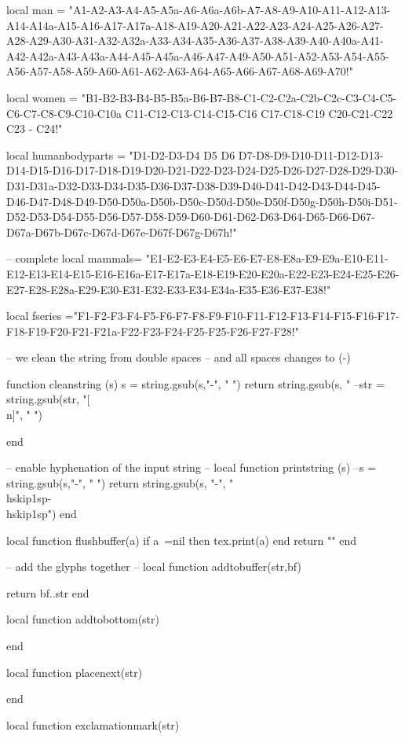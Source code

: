 \documentclass{article}
\begin{document}
\begin{luacode*}
local man = "A1-A2-A3-A4-A5-A5a-A6-A6a-A6b-A7-A8-A9-A10-A11-A12-A13-A14-A14a-A15-A16-A17-A17a-A18-A19-A20-A21-A22-A23-A24-A25-A26-A27-A28-A29-A30-A31-A32-A32a-A33-A34-A35-A36-A37-A38-A39-A40-A40a-A41-A42-A42a-A43-A43a-A44-A45-A45a-A46-A47-A49-A50-A51-A52-A53-A54-A55-A56-A57-A58-A59-A60-A61-A62-A63-A64-A65-A66-A67-A68-A69-A70!"

local women = "B1-B2-B3-B4-B5-B5a-B6-B7-B8-C1-C2-C2a-C2b-C2c-C3-C4-C5-C6-C7-C8-C9-C10-C10a C11-C12-C13-C14-C15-C16 C17-C18-C19 C20-C21-C22  C23 - C24!"

local humanbodyparts = "D1-D2-D3-D4 D5 D6 D7-D8-D9-D10-D11-D12-D13-D14-D15-D16-D17-D18-D19-D20-D21-D22-D23-D24-D25-D26-D27-D28-D29-D30-D31-D31a-D32-D33-D34-D35-D36-D37-D38-D39-D40-D41-D42-D43-D44-D45-D46-D47-D48-D49-D50-D50a-D50b-D50c-D50d-D50e-D50f-D50g-D50h-D50i-D51-D52-D53-D54-D55-D56-D57-D58-D59-D60-D61-D62-D63-D64-D65-D66-D67-D67a-D67b-D67c-D67d-D67e-D67f-D67g-D67h!"

-- complete
local mammals= "E1-E2-E3-E4-E5-E6-E7-E8-E8a-E9-E9a-E10-E11-E12-E13-E14-E15-E16-E16a-E17-E17a-E18-E19-E20-E20a-E22-E23-E24-E25-E26-E27-E28-E28a-E29-E30-E31-E32-E33-E34-E34a-E35-E36-E37-E38!"

local fseries ="F1-F2-F3-F4-F5-F6-F7-F8-F9-F10-F11-F12-F13-F14-F15-F16-F17-F18-F19-F20-F21-F21a-F22-F23-F24-F25-F25-F26-F27-F28!"

-- we clean the string from double spaces
-- and all spaces changes to (-)


function cleanstring (s)
  s = string.gsub(s,"-", " ")
  return string.gsub(s, "%
--str = string.gsub(str, "[\\n]", " ")
  
end

-- enable hyphenation of the input string
-- 
local function printstring (s)
  --s = string.gsub(s,"-", " ")
			  return string.gsub(s, "-", "\\hskip1sp-\\hskip1sp")
end

local function flushbuffer(a)
   if a~=nil then tex.print(a) end
   return ""
end

-- add the glyphs together
-- 
local function addtobuffer(str,bf)
  
   return bf..str
end

local function addtobottom(str)

end

local function placenext(str)

end

local function exclamationmark(str)
   

\end{luacode*}
\end{document}

